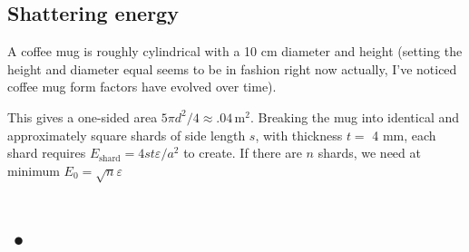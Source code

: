 \documentclass[12pt]{article}
\begin{document}
\subsection{Shattering energy}

A coffee mug is roughly cylindrical with a 10 cm diameter and height (setting the height and diameter equal seems to be in fashion right now actually, I've noticed coffee mug form factors have evolved over time).

This gives a one-sided area \(5\pi d^2/4 \approx .04 \,\mathrm{m}^2\). Breaking the mug into identical and approximately square shards of side length \(s\), with thickness \(t=\) 4 mm, each shard requires \(E_{\mathrm{shard}}=4st\varepsilon/a^2\) to create. If there are \(n\) shards, we need at minimum \(E_0 = \sqrt{n}\varepsilon\)


\section{•}
\end{document}
